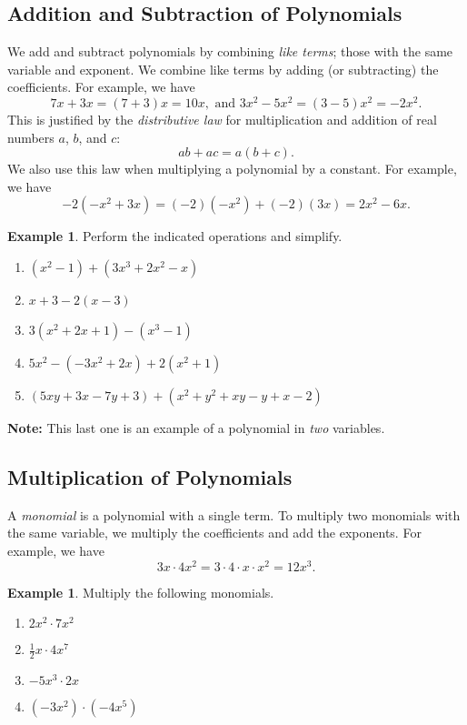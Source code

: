 \documentclass[letterpaper,12pt,oneside]{book}
\theoremstyle{definition}
\newtheorem{example}[theorem]{Example}
\begin{document}
\subsection*{Addition and Subtraction of Polynomials}

We add and subtract polynomials by combining \emph{like terms}; those with the same variable and exponent.  We combine like terms by adding (or subtracting) the coefficients.  For example, we have
\[
7x+3x=(7+3)x=10x, \text{ and } 3x^2-5x^2=(3-5)x^2=-2x^2.
\]
This is justified by the \emph{distributive law} for multiplication and addition of real numbers $a$, $b$, and $c$:
\[
ab+ac=a(b+c).
\]
We also use this law when multiplying a polynomial by a constant.  For example, we have
\[
-2(-x^2+3x)=(-2)(-x^2)+(-2)(3x)=2x^2-6x.
\]

\begin{example}
\item Perform the indicated operations and simplify.
\begin{enumerate}
\item $(x^2-1)+(3x^3+2x^2-x)$
\vfill
\item $x+3-2(x-3)$
\vfill
\item $3(x^2+2x+1)-(x^3-1)$
\vfill
\item $5x^2-(-3x^2+2x)+2(x^2+1)$
\vfill
\item $(5xy+3x-7y+3)+(x^2+y^2+xy-y+x-2)$
\vfill
\end{enumerate}
\end{example}

\noindent
\textbf{Note:} This last one is an example of a polynomial in \emph{two} variables.

\newpage

\subsection*{Multiplication of Polynomials}

A \emph{monomial} is a polynomial with a single term.  To multiply two monomials with the same variable, we multiply the coefficients and add the exponents.  For example, we have
\[
3x\cdot 4x^2=3\cdot 4\cdot x\cdot x^2=12x^3.
\]

\begin{example}
Multiply the following monomials.
\begin{multicols}{2}
\begin{enumerate}
\item $2x^2\cdot 7x^2$
\vspace{1cm}
\item $\tfrac{1}{2}x\cdot 4x^7$
\vspace{1cm}
\item $-5x^3\cdot 2x$
\vspace{1cm}
\item $(-3x^2)\cdot (-4x^5)$
\vspace{1cm}
\end{enumerate}
\end{multicols}
\vspace{1cm}
\end{example}
\end{document}
